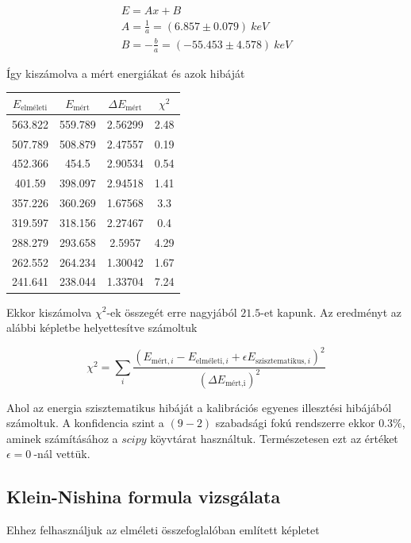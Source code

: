 \documentclass[a4paper,12pt]{article}
\begin{document}
\begin{gather*}
	E = A x + B \\
	A = \frac{1}{a} = (6.857 \pm 0.079) ~keV \\
	B = -\frac{b}{a} = (-55.453 \pm 4.578) ~keV
\end{gather*}

\par Így kiszámolva a mért energiákat és azok hibáját

\begin{center}
\begin{tabular}{|c|c|c|c|}
\hline
$E_{\text{elméleti}}$ & $E_{\text{mért}}$ & $\Delta E_{\text{mért}}$ & $\chi^{2}$ \\
\hline
563.822 & 559.789 & 2.56299 & 2.48 \\
\hline
507.789 & 508.879 & 2.47557 & 0.19\\
\hline
452.366 & 454.5 & 2.90534 & 0.54\\
\hline
401.59 & 398.097 & 2.94518 & 1.41\\
\hline
357.226 & 360.269 & 1.67568 & 3.3\\
\hline
319.597 & 318.156 & 2.27467 & 0.4\\
\hline
288.279 & 293.658 & 2.5957 & 4.29\\
\hline
262.552 & 264.234 & 1.30042 & 1.67\\
\hline
241.641 & 238.044 & 1.33704 & 7.24\\
\hline
\end{tabular}
\end{center}

\par Ekkor kiszámolva $\chi^{2}$-ek összegét erre nagyjából $21.5$-et kapunk. Az eredményt az alábbi képletbe helyettesítve számoltuk

\begin{equation*}
	\chi^{2} = \sum_{i}\frac{(E_{\text{mért}, i} - E_{\text{elméleti}, i} + \epsilon E_{\text{szisztematikus} , i})^{2}}{(\Delta E_{\text{mért,i}})^{2}}
\end{equation*}

\par Ahol az energia szisztematikus hibáját a kalibrációs egyenes illesztési hibájából számoltuk. A konfidencia szint a $(9-2)$ szabadsági fokú rendszerre ekkor $0.3\%$, aminek számításához a $scipy$ köyvtárat használtuk. Természetesen ezt az értéket $\epsilon = 0~$-nál vettük.

\subsection{Klein-Nishina formula vizsgálata}
\par Ehhez felhasználjuk az elméleti összefoglalóban említett képletet
\end{document}
